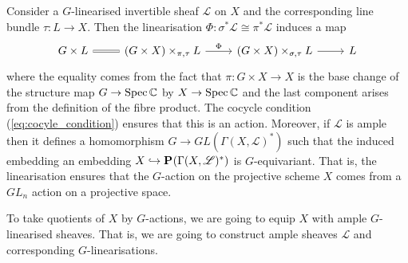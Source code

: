 \documentclass[12pt]{ociamthesis}  %
\begin{document}
\begin{example}\label{ex:linearised_action_on_bundle}
  Consider a $G$-linearised invertible sheaf $\mathscr L$ on $X$
  and the corresponding line bundle $\tau : L\to X$. Then the linearisation
  $\Phi : \sigma^*\mathscr L \cong \pi^*\mathscr L$ induces
  a map
  \begin{equation*}
    \begin{tikzcd}
      {G\times L} & {(G\times X)\times_{\pi,\tau} L} & {(G\times X)\times_{\sigma,\tau} L} & L
      \arrow[Rightarrow, no head, from=1-1, to=1-2]
      \arrow["\Phi", from=1-2, to=1-3]
      \arrow[from=1-3, to=1-4]
    \end{tikzcd}
  \end{equation*}
  where the equality comes from the fact that $\pi : G\times X \to X$
  is the base change of the structure map $G\to\operatorname{Spec}\mathbb C$
  by $X\to\operatorname{Spec}\mathbb C$ and the last component arises from the
  definition of the fibre product. The cocycle condition
  (\ref{eq:cocyle_condition}) ensures that this is an action. \cite[84]{huybrechts2010}
  Moreover, if $\mathscr L$ is ample then it defines a homomorphism
  $G\to GL(\Gamma(X,\mathscr L)^*)$ such that the induced embedding
  an embedding $X\hookrightarrow\mathbf{P}^{}_{}(\Gamma(X,\mathscr L)^*)$ is
  $G$-equivariant. \cite[Remark 5.20]{hoskins2016} That is, the
  linearisation ensures that the $G$-action on the projective
  scheme $X$ comes from a $GL_n$ action on a projective space.
\end{example}

To take quotients of $X$ by $G$-actions, we are going to equip
$X$ with ample $G$-linearised sheaves. That is, we are
going to construct ample sheaves $\mathscr L$ and corresponding
$G$-linearisations.
\end{document}
